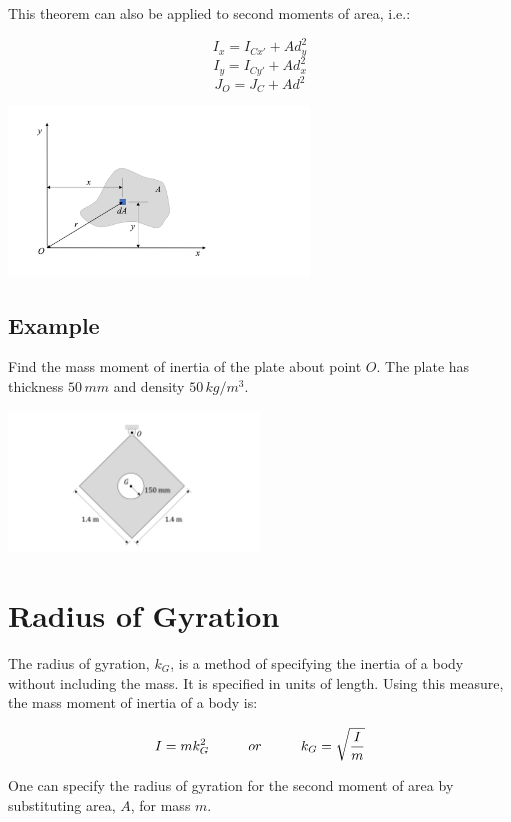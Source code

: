 \documentclass[12pt,letterpaper,twoside]{report}
\begin{document}
This theorem can also be applied to second moments of area, i.e.:

\[
I_x= I_{Cx'} + A d_y^2
\]
\[
I_y= I_{Cy'} + A d_x^2
\]
\[
J_O= J_{C} + A d^2
\]

\includegraphics[trim={1cm 1cm 4cm 1cm},clip,width=0.6\textwidth, center]{Slide42} 

\newpage

\subsection{Example}
Find the mass moment of inertia of the plate about point $O$.  The plate has thickness $50 \, mm$ and density $50 \, kg/m^3$.

\includegraphics[trim={6cm 1cm 5cm 1cm},clip,width=0.5\textwidth, left]{Slide48} 

\vspace*{10\baselineskip}

\newpage

\section{Radius of Gyration}
The radius of gyration, $k_G$, is a method of specifying the inertia of a body without including the mass.  It is specified in units of length.  Using this measure, the mass moment of inertia of a body is:

\[
I = mk_G^2 \hspace{1 cm} or \hspace{1 cm} \displaystyle k_G = \sqrt{\frac{I}{m}}
\]

One can specify the radius of gyration for the second moment of area by substituting area, $A$, for mass $m$.
\end{document}
